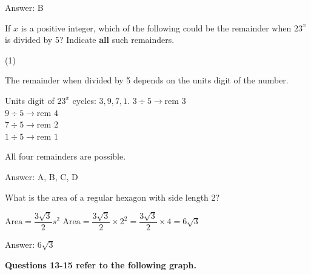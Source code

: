 \documentclass[11pt,paper=a4,answers]{exam}
\begin{document}
\begin{questions}
\begin{solution}
Answer: \colorbox{yellow!100}{B}
\end{solution}

\vspace{1cm}


\question
If $x$ is a positive integer, which of the following could be the remainder when $23^x$ is divided by 5?
Indicate \textbf{all} such remainders.

\begin{tasks}(1)
   
\end{tasks}

\begin{solution}
The remainder when divided by 5 depends on the units digit of the number.
\vspace{5pt}
\begin{center}
Units digit of $23^x$ cycles: $3, 9, 7, 1$.
\vspace{5pt}
$3 \div 5 \to \text{rem } 3$ \\
$9 \div 5 \to \text{rem } 4$ \\
$7 \div 5 \to \text{rem } 2$ \\
$1 \div 5 \to \text{rem } 1$
\end{center}
\vspace{5pt}
All four remainders are possible.

Answer: \colorbox{yellow!100}{A, B, C, D}
\end{solution}

\vspace{1cm}


\question
What is the area of a regular hexagon with side length 2?

\begin{solution}
\begin{center}
$\text{Area} = \dfrac{3\sqrt{3}}{2}s^2$
\vspace{5pt}
$\text{Area} = \dfrac{3\sqrt{3}}{2} \times 2^2 = \dfrac{3\sqrt{3}}{2} \times 4 = 6\sqrt{3}$
\end{center}

Answer: \colorbox{yellow!100}{$6\sqrt{3}$}
\end{solution}

\vspace{1cm}

\textbf{Questions 13-15 refer to the following graph.}


\end{questions}
\end{document}
